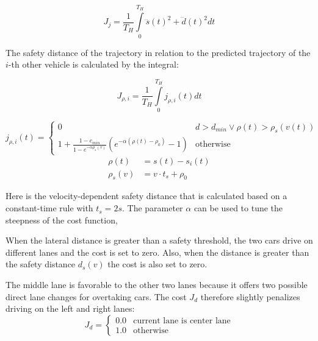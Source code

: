\documentclass[twoside]{article}
\begin{document}
\begin{equation}
J_{j} = \frac{1}{T_H}\int\limits_0^{T_{H}}\dddot s(t)^2 + \dddot d(t)^2 dt
\end{equation}


The safety distance of the trajectory in relation to the predicted trajectory of the $i$-th
other vehicle is calculated by the integral:

\begin{equation}
J_{\rho,i} = \frac{1}{T_H} \int\limits_0^{T_H} j_{\rho,i}(t) dt
\end{equation}

\begin{equation}
j_{\rho,i}(t) =
\begin{cases}
  0 & d > d_{min} \vee \rho(t) > \rho_s(v(t)) \\
  1 + \frac{1 - c_{min}}{1-e^{-\alpha \rho_s(v)}} \left(e^{-\alpha(\rho(t) - \rho_{0})} - 1 \right) & \text{otherwise}
  \end{cases}
\end{equation}
\begin{align}
\rho(t) &= s(t) - s_i(t) \\
\rho_s(v) &= v \cdot t_s + \rho_0
\end{align}



Here  is the velocity-dependent safety distance that is calculated based on
a constant-time rule with $t_s = 2s$. The parameter $\alpha$ can be used to tune the steepness
of the cost function,

When the lateral distance is greater than a safety threshold, the two cars drive on
different lanes and the cost is set to zero. Also, when the distance is greater than
the safety distance $d_s(v)$ the cost is also set to zero.

The middle lane is favorable to the other two lanes because it offers two possible direct
lane changes for overtaking cars. The cost $J_d$ therefore slightly penalizes driving
on the left and right lanes:
\begin{equation}
J_d =
\begin{cases}
0.0 & \text{current lane is center lane} \\
1.0 & \text{otherwise}
\end{cases}
\end{equation}

\end{document}
